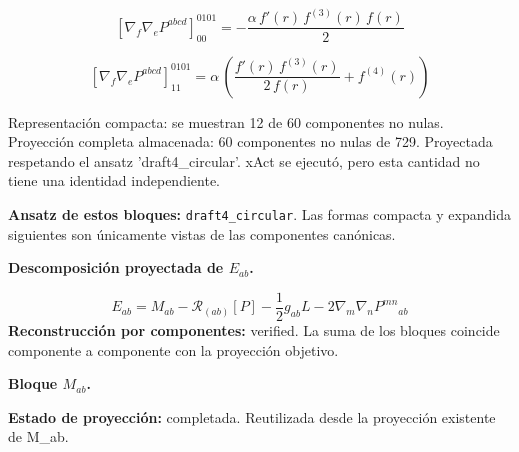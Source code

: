 \documentclass[11pt]{article}
\begin{document}
\par\smallskip
\begin{dmath*}[breakdepth={5}]
\left[\nabla_f\nabla_e P^{abcd}\right]_{00}^{0101} = -\frac{\alpha\,f'\!\left(r\right)\,f^{(3)}\!\left(r\right)\,f\!\left(r\right)}{2}
\end{dmath*}
\par\smallskip
\begin{dmath*}[breakdepth={5}]
\left[\nabla_f\nabla_e P^{abcd}\right]_{11}^{0101} = \alpha\,\left(\frac{f'\!\left(r\right)\,f^{(3)}\!\left(r\right)}{2\,f\!\left(r\right)} + f^{(4)}\!\left(r\right)\right)
\end{dmath*}
\par\smallskip
Representación compacta: se muestran 12 de 60 componentes no nulas.
Proyección completa almacenada: 60 componentes no nulas de 729. Proyectada respetando el ansatz 'draft4\_circular'. xAct se ejecutó, pero esta cantidad no tiene una identidad independiente.\par\medskip
{}
\par\bigskip{}\par
\textbf{Ansatz de estos bloques:} \texttt{draft4\_circular}. Las formas compacta y expandida siguientes son únicamente vistas de las componentes canónicas.\par
{}
\par\medskip\noindent\textbf{Descomposición proyectada de $ E_{ab} $.}\par
\begin{dmath*}[breakdepth={5}]
E_{ab}=M_{ab}-\mathcal{R}_{(ab)}[P]-\frac{1}{2}g_{ab}L-2\nabla_m\nabla_nP^{mn}{}_{ab}
\end{dmath*}
\textbf{Reconstrucción por componentes:} verified. La suma de los bloques coincide componente a componente con la proyección objetivo.\par
\par\smallskip\noindent\textbf{Bloque $ M_{ab} $.}\par
\textbf{Estado de proyección:} completada. Reutilizada desde la proyección existente de M\_ab.\par
\end{document}
